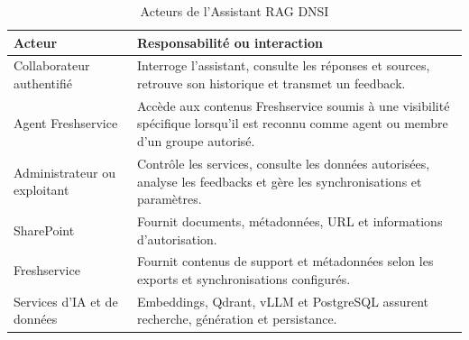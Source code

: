 \begin{table}[H]
\centering
\caption{Acteurs de l'Assistant RAG DNSI}
\label{tab:acteurs_ch4}
\begin{tabular}{p{3.5cm}p{10cm}}
\toprule
\textbf{Acteur} & \textbf{Responsabilité ou interaction} \\
\midrule
Collaborateur authentifié & Interroge l'assistant, consulte les réponses et sources, retrouve son historique et transmet un feedback. \\
Agent Freshservice & Accède aux contenus Freshservice soumis à une visibilité spécifique lorsqu'il est reconnu comme agent ou membre d'un groupe autorisé. \\
Administrateur ou exploitant & Contrôle les services, consulte les données autorisées, analyse les feedbacks et gère les synchronisations et paramètres. \\
SharePoint & Fournit documents, métadonnées, URL et informations d'autorisation. \\
Freshservice & Fournit contenus de support et métadonnées selon les exports et synchronisations configurés. \\
Services d'IA et de données & Embeddings, Qdrant, vLLM et PostgreSQL assurent recherche, génération et persistance. \\
\bottomrule
\end{tabular}
\end{table}
